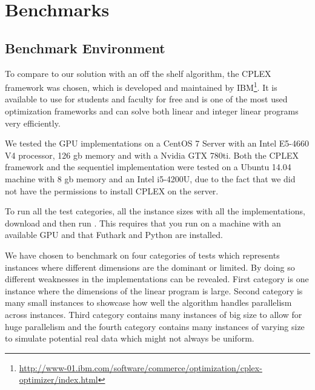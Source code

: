 \section{Benchmarks}
\subsection{Benchmark Environment}
To compare to our solution with an off the shelf algorithm, the CPLEX framework was chosen, which is developed and maintained by IBM\footnote{\url{http://www-01.ibm.com/software/commerce/optimization/cplex-optimizer/index.html}}. It is available to use for students and faculty for free and is one of the most used optimization frameworks and can solve both linear and integer linear programs very efficiently.

We tested the GPU implementations on a CentOS 7 Server with an Intel E5-4660 V4 processor, 126 gb memory and with a Nvidia GTX 780ti. Both the CPLEX framework and the sequentiel 
implementation were tested on a Ubuntu 14.04 machine with 8 gb memory and an Intel i5-4200U, due to the fact that we did not have the permissions to install CPLEX on the server.

To run all the test categories, all the instance sizes with all the implementations, download  and then run . This requires that you run on a machine with an available GPU and that Futhark and Python are installed.

We have chosen to benchmark on four categories of tests which represents instances where different dimensions are the dominant or limited. By doing so different weaknesses in the implementations can be revealed. First category is one instance where the dimensions of the linear program is large. Second category is many small instances to showcase how well the algorithm handles parallelism across instances. Third category contains many instances of big size to allow for huge parallelism and the fourth category contains many instances of varying size to simulate potential real data which might not always be uniform.


